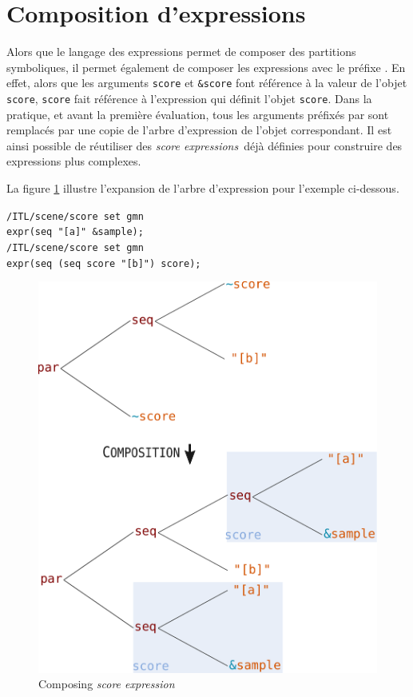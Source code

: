 \documentclass{article}
\newcommand{\OSC}[1]{\texttt{#1}}
\newcommand{\oper}[1]{\textcolor{figRed}{#1}}
\newcommand{\param}[1]{\textcolor{figOrange}{#1}}
\newcommand{\prefix}[1]{\textcolor{figBlue}{#1}}
\newcommand{\sExpr}{\emph{score expression}}
\newcommand{\sExprs}{\emph{score expressions}}
\newcommand{\lowTilde}{\texttildelow}
\newcommand{\tab}{\hspace*{4mm}}
\newcommand{\sample}	[1]			{\vspace{-0.2em}\begin{center}\colorbox{mygrey}{\begin{minipage}[t]{0.97\columnwidth} {\small \texttt{#1}}\end{minipage}}\end{center}}
\begin{document}
\section{Composition d'expressions}
\label{composingExpr}
Alors que le langage des expressions permet de composer des partitions symboliques, il permet également de composer les expressions avec le préfixe  \OSC{\prefix{\lowTilde}}. En effet, alors que les arguments \OSC{\param{score}} et \OSC{\prefix{\&}\param{score}} font référence à la valeur de l'objet \OSC{score}, \OSC{\prefix{\lowTilde}\param{score}} fait référence à l'expression qui définit l'objet \OSC{score}. Dans la pratique, et avant la première évaluation, tous les arguments préfixés par \OSC{\prefix{\lowTilde}} sont remplacés par une copie de l'arbre d'expression de l'objet correspondant. Il est ainsi possible de réutiliser des \sExprs\ déjà définies pour construire des expressions plus complexes.

La figure \ref{fig:expandingTree} illustre l'expansion de l'arbre d'expression pour l'exemple ci-dessous.

\sample{/ITL/scene/score set gmn\\
\tab expr(\oper{seq} \param{"[a]"} \prefix{\&}\param{sample});\\
/ITL/scene/score set gmn  \\
\tab expr(\oper{seq} (\oper{seq} \prefix{\lowTilde}\param{score} \param{"[b]"}) \prefix{\lowTilde}\param{score});
}

\begin{figure}[th]
\centering
\includegraphics[width=0.9\columnwidth]{imgs/expandingTree}
\caption{Composing \sExpr
\label{fig:expandingTree}}
\end{figure}
\end{document}
